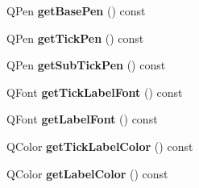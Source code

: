 \begin{DoxyCompactItemize}
Q\+Pen {\bfseries get\+Base\+Pen} () const
\item 
\mbox{\label{class_q_c_p_axis_afe7d57415cbbf31e5549a5cc40b6f8d8}} 
Q\+Pen {\bfseries get\+Tick\+Pen} () const
\item 
\mbox{\label{class_q_c_p_axis_aad7739c229b292ddab0b3a43a5676f54}} 
Q\+Pen {\bfseries get\+Sub\+Tick\+Pen} () const
\item 
\mbox{\label{class_q_c_p_axis_a694ab8b4240f3c90a866372e3dcb364f}} 
Q\+Font {\bfseries get\+Tick\+Label\+Font} () const
\item 
\mbox{\label{class_q_c_p_axis_aeac21c907d2516af9cde9a463043d671}} 
Q\+Font {\bfseries get\+Label\+Font} () const
\item 
\mbox{\label{class_q_c_p_axis_a8d00d5b78ecfbebbea5a8161bddb9a17}} 
Q\+Color {\bfseries get\+Tick\+Label\+Color} () const
\item 
\mbox{\label{class_q_c_p_axis_ae914abd56afa570cb9f2ab50e59c0f0e}} 
Q\+Color {\bfseries get\+Label\+Color} () const
\end{DoxyCompactItemize}
